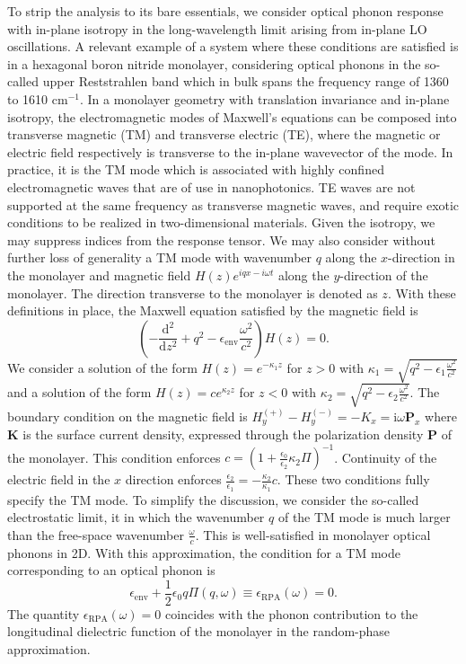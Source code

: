 \documentclass[aps,prb,twocolumn,
groupedaddress,superscriptaddress,
amsfonts,amssymb,amsmath,floatfix,
citeautoscript]{revtex4-1}
\newcommand{\iu}{\mathrm{i}}
\newcommand{\dd}{\mathrm{d}}
\begin{document}
	To strip the analysis to its bare essentials, we consider optical phonon response with in-plane isotropy in the long-wavelength limit arising from in-plane LO oscillations. A relevant example of a system where these conditions are satisfied is in a hexagonal boron nitride monolayer, considering optical phonons in the so-called upper Reststrahlen band which in bulk spans the frequency range of 1360 to 1610 cm$^{-1}$. In a monolayer geometry with translation invariance and in-plane isotropy, the electromagnetic modes of Maxwell's equations can be composed into transverse magnetic (TM) and transverse electric (TE), where the magnetic or electric field respectively is transverse to the in-plane wavevector of the mode. In practice, it is the TM mode which is associated with highly confined electromagnetic waves that are of use in nanophotonics. TE waves are not supported at the same frequency as transverse magnetic waves, and require exotic conditions to be realized in two-dimensional materials. Given the isotropy, we may suppress indices from the response tensor. We may also consider without further loss of generality a TM mode with wavenumber $q$ along the $x$-direction in the monolayer and magnetic field $H(z)e^{iqx-i\omega t}$ along the $y$-direction of the monolayer. The direction transverse to the monolayer is denoted as $z$.  With these definitions in place, the Maxwell equation satisfied by the magnetic field is \begin{equation}\label{eq:2dmaxwell}
	\left(-\frac{\dd^2}{\dd{}z^2}+q^2-\epsilon_{\mathrm{env}}\frac{\omega^2}{c^2} \right)H(z) = 0.
	\end{equation}
	We consider a solution of the form $H(z) = e^{-\kappa_1 z}$ for $z > 0$ with $\kappa_1 = \sqrt{q^2-\epsilon_1\frac{\omega^2}{c^2}}$ and a solution of the form $H(z) = ce^{\kappa_2 z}$ for $z < 0$ with $\kappa_2 = \sqrt{q^2-\epsilon_2\frac{\omega^2}{c^2}}$. The boundary condition on the magnetic field is $H_y^{(+)}-H_y^{(-)} = -K_x = \iu\omega\mathbf{P}_x$ where $\mathbf{K}$ is the surface current density, expressed through the polarization density $\mathbf{P}$ of the monolayer. This condition enforces $c =(1+\frac{\epsilon_0}{\epsilon_2} \kappa_2\Pi)^{-1}$. Continuity of the electric field in the $x$ direction enforces $\frac{\epsilon_2}{\epsilon_1} = -\frac{\kappa_2}{\kappa_1}c$. These two conditions fully specify the TM mode. To simplify the discussion, we consider the so-called electrostatic limit, it in which the wavenumber $q$ of the TM mode is much larger than the free-space wavenumber $\frac{\omega}{c}$. This is well-satisfied in monolayer optical phonons in 2D. With this approximation, the condition for a TM mode corresponding to an optical phonon is
	\begin{equation}
	\epsilon_{\mathrm{env}} + \frac{1}{2}\epsilon_0 q \Pi(q,\omega) \equiv \epsilon_{\mathrm{RPA}}(\omega) = 0.
	\end{equation}
	The quantity $\epsilon_{\mathrm{RPA}}(\omega) = 0$ coincides with the phonon contribution to the longitudinal dielectric function of the monolayer in the random-phase approximation. 
	
\end{document}

